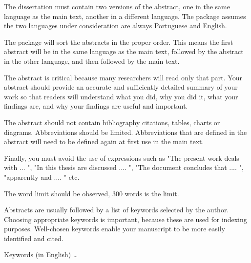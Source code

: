 \abstractEN %

The dissertation must contain two versions of the abstract, one in the same language as the main text, another in a different language. The package assumes the two languages under consideration are always Portuguese and English.

The package will sort the abstracts in the proper order. This means the first abstract will be in the same language as the main text, followed by the abstract in the other language, and then followed by the main text.

The abstract is critical because many researchers will read only that part. Your abstract should provide an accurate and sufficiently detailed summary of your work so that readers will understand what you did, why you did it, what your findings are, and why your findings are useful and important.

The abstract should not contain bibliography citations, tables, charts or diagrams. Abbreviations should be limited. Abbreviations that are defined in the abstract will need to be defined again at first use in the main text.

Finally, you must avoid the use of expressions such as "The present work deals with ... ", "In this thesis are discussed .... ", "The document concludes that .... ", "apparently and .... " etc.

The word limit should be observed, 300 words is the limit.

Abstracts are usually followed by a list of keywords selected by the author. Choosing appropriate keywords is important, because these are used for indexing purposes. Well-chosen keywords enable your manuscript to be more easily identified and cited.

\begin{keywords}
    Keywords (in English) \ldots
\end{keywords} 
